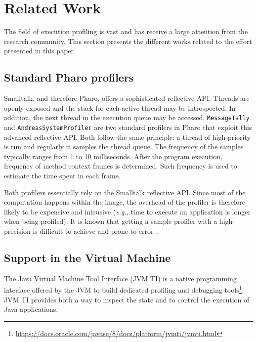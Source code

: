 \documentclass[10pt,preprint,nonatbib]{sigplanconf}
\newcommand{\ct}{\lstinline[backgroundcolor=\color{white},basicstyle=\small\ttfamily]}
\newcommand{\eg}{\emph{e.g.,}\xspace}
\newcommand{\seclabel}[1]{\label{sec:#1}}
\begin{document}
\section{Related Work}\seclabel{relatedWork}

The field of execution profiling is vast and has receive a large attention from the research community. This section presents the different works related to the effort presented in this paper.

\subsection{Standard Pharo profilers}

Smalltalk, and therefore Pharo, offers a sophisticated reflective API. Threads are openly exposed and the stack for each active thread may be introspected. In addition, the next thread in the execution queue may be accessed. \ct{MessageTally} and \ct{AndreasSystemProfiler} are two standard profilers in Pharo that exploit this advanced reflective API. Both follow the same principle: a thread of high-priority is run and regularly it samples the thread queue. The frequency of the samples typically ranges from 1 to 10 milliseconds. After the program execution, frequency of method context frames is determined. Such frequency is used to estimate the time spent in each frame. 

Both profilers essentially rely on the Smalltalk reflective API. Since most of the computation happens within the image, the overhead of the profiler is therefore likely to be expensive and intrusive (\eg time to execute an application is longer when being profiled). It is known that getting a sample profiler with a high-precision is difficult to achieve and prone to error~\cite{Mytk08a,Mytk10a,Berg11d}. 

\subsection{Support in the Virtual Machine}

The Java Virtual Machine Tool Interface (JVM TI) is a native programming interface offered by the JVM to build dedicated profiling and debugging tools\footnote{\url{https://docs.oracle.com/javase/8/docs/platform/jvmti/jvmti.html}}. JVM TI provides both a way to inspect the state and to control the execution of Java applications. %
\end{document}
